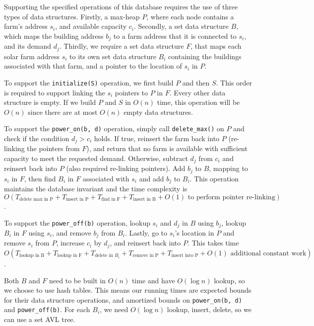 \documentclass[12pt,twoside]{article}
\begin{document}
\begin{problems}
\begin{problemparts}
\end{problemparts}

\newpage
\problem  %
Supporting the specified operations of this database requires the use of three types of data structures. Firstly, a max-heap $P$, where each node contains a farm's address $s_i$, and available capacity $c_i$. Secondly, a set data structure $B$, which maps the building address $b_j$ to a farm address that it is connected to $s_i$, and its demand $d_j$. Thirdly, we require a set data structure $F$, that maps each solar farm address $s_i$ to its own set data structure $B_i$ containing the buildings associated with that farm, and a pointer to the location of $s_i$ in $P$.

To support the \verb|initialize(S)| operation, we first build $P$ and then $S$. This order is required to support linking the $s_i$ pointers to $P$ in $F$. Every other data structure is empty. If we build $P$ and $S$ in $O(n)$ time, this operation will be $O(n)$ since there are at most $O(n)$ empty data structures.

To support the \verb|power_on(b, d)| operation, simply call \verb|delete_max()| on $P$ and check if the condition $d_j>c_i$ holds. If true, reinsert the farm back into $P$ (re-linking the pointers from $F$), and return that no farm is available with sufficient capacity to meet the requested demand. Otherwise, subtract $d_j$ from $c_i$ and reinsert back into $P$ (also required re-linking pointers). Add $b_j$ to $B$, mapping to $s_i$ in $F$, then find $B_i$ in $F$ associated with $s_i$ and add $b_j$ to $B_i$. This operation maintains the database invariant and the time complexity is $O(T_{\text{delete max in P}} + T_{\text{insert in P}} + T_{\text{find in F}} + T_{\text{insert in B}} + O(1) \text{ to perform pointer re-linking})$.

To support the \verb|power_off(b)| operation, lookup $s_i$ and $d_j$ in $B$ using $b_j$, lookup $B_i$ in $F$ using $s_i$, and remove $b_j$ from $B_i$. Lastly, go to $s_i$'s location in $P$ and remove $s_i$ from $P$, increase $c_i$ by $d_j$, and reinsert back into $P$. This takes time $O(T_{\text{lookup in B}} + T_{\text{lookup in F}} + T_{\text{delete in } B_i} + T_{\text{remove in P}} + T_{\text{insert into P}} + O(1) \text{ additional constant work})$.

Both $B$ and $F$ need to be built in $O(n)$ time and have $O(\log n)$ lookup, so we choose to use hash tables. This means our running times are expected bounds for their data structure operations, and amortized bounds on \verb|power_on(b, d)| and \verb|power_off(b)|. For each $B_i$, we need $O(\log n)$ lookup, insert, delete, so we can use a set AVL tree.


\end{problems}
\end{document}
